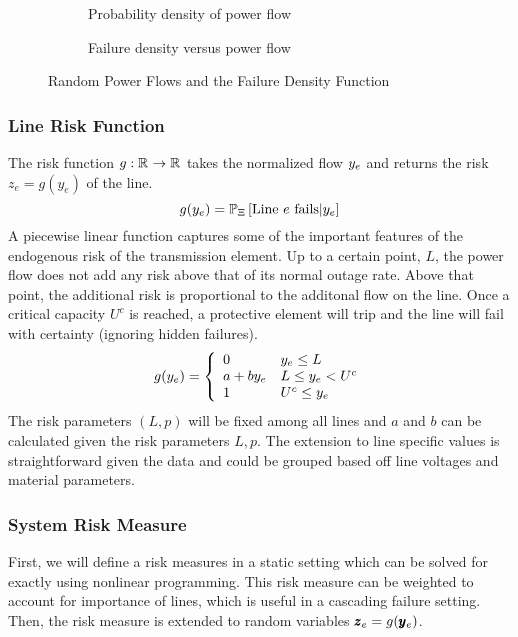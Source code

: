 \begin{figure}
  \centering
  \begin{subfigure}[b]{0.445\textwidth}
    
    \caption{Probability density of power flow}
  \end{subfigure}
  \begin{subfigure}[b]{.445\textwidth}
    
    \caption{Failure density versus power flow}
  \end{subfigure}
  \caption{Random Power Flows and the Failure Density Function}
\end{figure}

\subsubsection*{Line Risk Function}
The risk function $g : \mathbb{R}^{} \rightarrow \mathbb{R}^{}$ takes the normalized flow $y_e$ and returns the risk $z_e = g(y_e)$ of the line.  
\begin{equation}
 g(y_e) = \mathbb{P}_{\Xi} \left[ \text{Line }e\text{ fails} | y_e \right] 
\end{equation}
A piecewise linear function captures some of the important features of the endogenous risk of the transmission element.  Up to a certain point, $L$, the power flow does not add any risk above that of its normal outage rate.  Above that point, the additional risk is proportional to the additonal flow on the line.  Once a critical capacity $U^c$ is reached, a protective element will trip and the line will fail with certainty (ignoring hidden failures).  
\begin{equation}\label{pwl_risk}
g(y_e) = \left\{ \begin{array}{l l}
  0 & y_e \leq L \\
  a + b y_e & L \leq y_e < U^c \\
  1 & U^c \leq y_e 
\end{array}
\right.
\end{equation}
The risk parameters $(L, p)$ will be fixed among all lines and  $a$ and $b$ can be calculated given the risk parameters $L,p$. 
\endnote{}
The extension to line specific values is straightforward given the data and could be grouped based off line voltages and material parameters.


\subsubsection*{System Risk Measure}
First, we will define a risk measures in a static setting which can be solved for exactly using nonlinear programming. This risk measure can be weighted to account for importance of lines, which is useful in a cascading failure setting.
\endnote{}
Then, the risk measure is extended to random variables $\pmb{z}_e = g( \pmb{y}_e )$.


